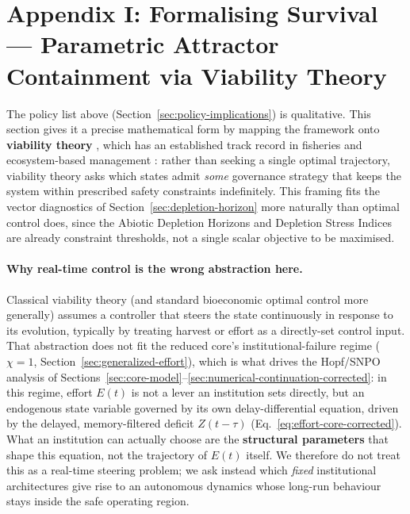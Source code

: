 \documentclass[twocolumn,10pt]{article}
\begin{document}
\section{Appendix I: Formalising Survival --- Parametric Attractor Containment via Viability Theory}
\label{sec:viability}
The policy list above (Section~\ref{sec:policy-implications}) is qualitative. This section gives it a precise mathematical form by mapping the framework onto \textbf{viability theory} \cite{aubin1991}, which has an established track record in fisheries and ecosystem-based management \cite{cury2005}: rather than seeking a single optimal trajectory, viability theory asks which states admit \emph{some} governance strategy that keeps the system within prescribed safety constraints indefinitely. This framing fits the vector diagnostics of Section~\ref{sec:depletion-horizon} more naturally than optimal control does, since the Abiotic Depletion Horizons and Depletion Stress Indices are already constraint thresholds, not a single scalar objective to be maximised.

\paragraph{Why real-time control is the wrong abstraction here.} Classical viability theory (and standard bioeconomic optimal control more generally) assumes a controller that steers the state continuously in response to its evolution, typically by treating harvest or effort as a directly-set control input. That abstraction does not fit the reduced core's institutional-failure regime ($\chi=1$, Section~\ref{sec:generalized-effort}), which is what drives the Hopf/SNPO analysis of Sections~\ref{sec:core-model}--\ref{sec:numerical-continuation-corrected}: in this regime, effort $E(t)$ is not a lever an institution sets directly, but an endogenous state variable governed by its own delay-differential equation, driven by the delayed, memory-filtered deficit $Z(t-\tau)$ (Eq.~\eqref{eq:effort-core-corrected}). What an institution can actually choose are the \textbf{structural parameters} that shape this equation, not the trajectory of $E(t)$ itself. We therefore do not treat this as a real-time steering problem; we ask instead which \emph{fixed} institutional architectures give rise to an autonomous dynamics whose long-run behaviour stays inside the safe operating region.
\end{document}
